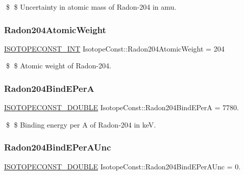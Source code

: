 \$ \$ Uncertainty in atomic mass of Radon-\/204 in amu. \mbox{\label{group___isotope_const-_radon-_rn204_ga8cd66d932f9e68f933db38a4fed1c17b}} 
\subsubsection{\texorpdfstring{Radon204\+Atomic\+Weight}{Radon204AtomicWeight}}
{\footnotesize\ttfamily \mbox{\hyperlink{group___isotope_const-_macros_ga5f18360b3e99483a35c32d789e62621c}{I\+S\+O\+T\+O\+P\+E\+C\+O\+N\+S\+T\+\_\+\+I\+NT}} Isotope\+Const\+::\+Radon204\+Atomic\+Weight = 204}

\$ \$ Atomic weight of Radon-\/204. \mbox{\label{group___isotope_const-_radon-_rn204_ga0fdd4e4a68af116268607e9c98816771}} 
\subsubsection{\texorpdfstring{Radon204\+Bind\+E\+PerA}{Radon204BindEPerA}}
{\footnotesize\ttfamily \mbox{\hyperlink{group___isotope_const-_macros_ga8f45a7272ce02c0b4c65c44636ed719a}{I\+S\+O\+T\+O\+P\+E\+C\+O\+N\+S\+T\+\_\+\+D\+O\+U\+B\+LE}} Isotope\+Const\+::\+Radon204\+Bind\+E\+PerA = 7780.}

\$ \$ Binding energy per A of Radon-\/204 in keV. \mbox{\label{group___isotope_const-_radon-_rn204_gada2f4fb38201ebe48b01a2e0fba9c9a2}} 
\subsubsection{\texorpdfstring{Radon204\+Bind\+E\+Per\+A\+Unc}{Radon204BindEPerAUnc}}
{\footnotesize\ttfamily \mbox{\hyperlink{group___isotope_const-_macros_ga8f45a7272ce02c0b4c65c44636ed719a}{I\+S\+O\+T\+O\+P\+E\+C\+O\+N\+S\+T\+\_\+\+D\+O\+U\+B\+LE}} Isotope\+Const\+::\+Radon204\+Bind\+E\+Per\+A\+Unc = 0.}

